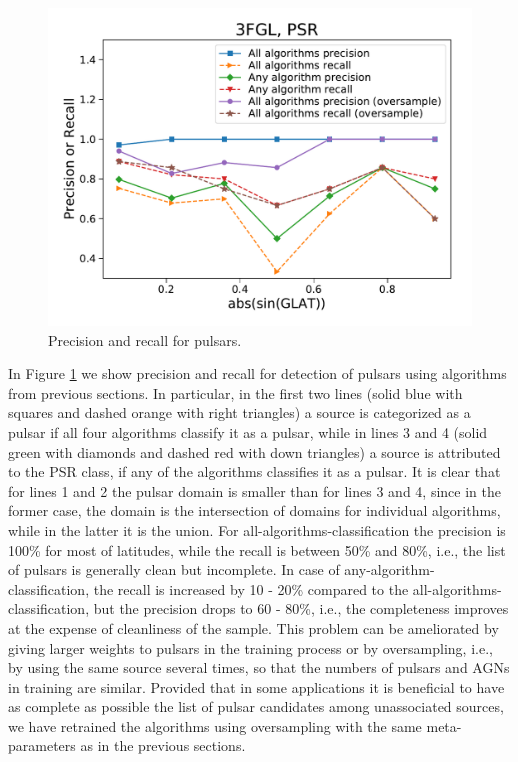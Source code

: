 \begin{figure}[h]
\includegraphics[width=\twopicsp\textwidth]{plots/All_algs_3FGL_precision_recall_oversample.pdf}
\caption{Precision and recall for pulsars.}
\label{fig:prec_recall}
\end{figure}


In Figure \ref{fig:prec_recall} we show precision and recall for detection of pulsars using algorithms from previous sections.
In particular, in the first two lines (solid blue with squares and dashed orange with right triangles) a source is categorized as a pulsar if all four algorithms classify it as a pulsar,
while in lines 3 and 4 (solid green with diamonds and dashed red with down triangles) a source is attributed to the PSR class, if any of the algorithms classifies it as a pulsar.
It is clear that for lines 1 and 2 the pulsar domain is smaller than for lines 3 and 4, since in the former case, the domain is the intersection of domains for individual algorithms, while in the latter it is the union.
For all-algorithms-classification the precision is 100\% for most of latitudes, while the recall is between 50\% and 80\%, i.e., the list of pulsars is generally clean but incomplete.
In case of any-algorithm-classification, the recall is increased by 10 - 20\% compared to the all-algorithms-classification, but the precision drops to 60 - 80\%, i.e., the completeness improves at the expense of cleanliness of the sample.
This problem can be ameliorated by giving larger weights to pulsars in the training process or by oversampling, i.e., by using the same source several times, so that the numbers of pulsars and AGNs in training are similar.
Provided that in some applications it is beneficial to have as complete as possible the list of pulsar candidates among unassociated sources, we have retrained the algorithms using oversampling with the same meta-parameters as in the previous sections.

